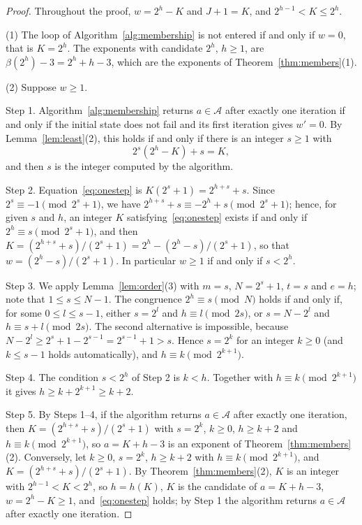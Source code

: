 \documentclass[11pt]{amsart}
\theoremstyle{definition}
\begin{document}
\begin{proof}
Throughout the proof, $w=2^h-K$ and $J+1=K$, and $2^{h-1}<K\le2^h$.

(1) The loop of Algorithm~\ref{alg:membership} is not entered if and only if $w=0$, that is $K=2^h$. The exponents with candidate $2^h$, $h\ge1$, are $\beta(2^h)-3=2^h+h-3$, which are the exponents of Theorem~\ref{thm:members}(1).

(2) Suppose $w\ge1$.

Step 1. Algorithm~\ref{alg:membership} returns $a\in\mathcal{A}$ after exactly one iteration if and only if the initial state does not fail and its first iteration gives $w'=0$. By Lemma~\ref{lem:least}(2), this holds if and only if there is an integer $s\ge1$ with
\begin{equation}
\label{eq:onestep}
2^s(2^h-K)+s=K,
\end{equation}
and then $s$ is the integer computed by the algorithm.

Step 2. Equation~\eqref{eq:onestep} is $K(2^s+1)=2^{h+s}+s$. Since $2^s\equiv-1\pmod{2^s+1}$, we have $2^{h+s}+s\equiv-2^h+s\pmod{2^s+1}$; hence, for given $s$ and $h$, an integer $K$ satisfying~\eqref{eq:onestep} exists if and only if $2^h\equiv s\pmod{2^s+1}$, and then $K=(2^{h+s}+s)/(2^s+1)=2^h-(2^h-s)/(2^s+1)$, so that $w=(2^h-s)/(2^s+1)$. In particular $w\ge1$ if and only if $s<2^h$.

Step 3. We apply Lemma~\ref{lem:order}(3) with $m=s$, $N=2^s+1$, $t=s$ and $e=h$; note that $1\le s\le N-1$. The congruence $2^h\equiv s\pmod N$ holds if and only if, for some $0\le l\le s-1$, either $s=2^l$ and $h\equiv l\pmod{2s}$, or $s=N-2^l$ and $h\equiv s+l\pmod{2s}$. The second alternative is impossible, because $N-2^l\ge2^s+1-2^{s-1}=2^{s-1}+1>s$. Hence $s=2^k$ for an integer $k\ge0$ (and $k\le s-1$ holds automatically), and $h\equiv k\pmod{2^{k+1}}$.

Step 4. The condition $s<2^h$ of Step 2 is $k<h$. Together with $h\equiv k\pmod{2^{k+1}}$ it gives $h\ge k+2^{k+1}\ge k+2$.

Step 5. By Steps 1--4, if the algorithm returns $a\in\mathcal{A}$ after exactly one iteration, then $K=(2^{h+s}+s)/(2^s+1)$ with $s=2^k$, $k\ge0$, $h\ge k+2$ and $h\equiv k\pmod{2^{k+1}}$, so $a=K+h-3$ is an exponent of Theorem~\ref{thm:members}(2). Conversely, let $k\ge0$, $s=2^k$, $h\ge k+2$ with $h\equiv k\pmod{2^{k+1}}$, and $K=(2^{h+s}+s)/(2^s+1)$. By Theorem~\ref{thm:members}(2), $K$ is an integer with $2^{h-1}<K<2^h$, so $h=h(K)$, $K$ is the candidate of $a=K+h-3$, $w=2^h-K\ge1$, and~\eqref{eq:onestep} holds; by Step 1 the algorithm returns $a\in\mathcal{A}$ after exactly one iteration.


\end{proof}
\end{document}
